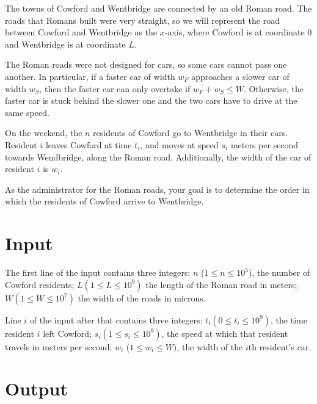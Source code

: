 
The towns of Cowford and Wentbridge are connected by an old Roman road.
The roads that Romans built were very straight, so we will represent the road between Cowford and Wentbridge as the $x$-axis, where Cowford is at coordinate $0$ and Wentbridge is at coordinate $L$.

The Roman roads were not designed for cars, so some cars cannot pass one another.
In particular, if a faster car of width $w_F$ approaches a slower car of width $w_S$, then the faster car can only overtake if $w_F + w_S \leq W$.
Otherwise, the faster car is stuck behind the slower one and the two cars have to drive at the same speed.

On the weekend, the $n$ residents of Cowford go to Wentbridge in their cars.
Resident $i$ leaves Cowford at time $t_i$, and moves at speed $s_i$ meters per second towards Wendbridge, along the Roman road.
Additionally, the width of the car of resident $i$ is $w_i$.

As the administrator for the Roman roads, your goal is to determine the order in which the residents of Cowford arrive to Wentbridge.

\section*{Input}
The first line of the input contains three integers: $n$ ($1 \leq n \leq 10^5$), the number of Cowford residents; $L (1 \leq L \leq 10^9)$ the length of the Roman road in meters; $W (1 \leq W \leq 10^7)$ the width of the roads in microns.

Line $i$ of the input after that contains three integers: $t_i (0 \leq t_i \leq 10^9)$, the time resident $i$ left Cowford; $s_i (1 \leq s_i \leq 10^9)$, the speed at which that resident travels in meters per second; $w_i$ ($1 \leq w_i \leq W)$, the width of the $i$th resident's car.

\section*{Output}
